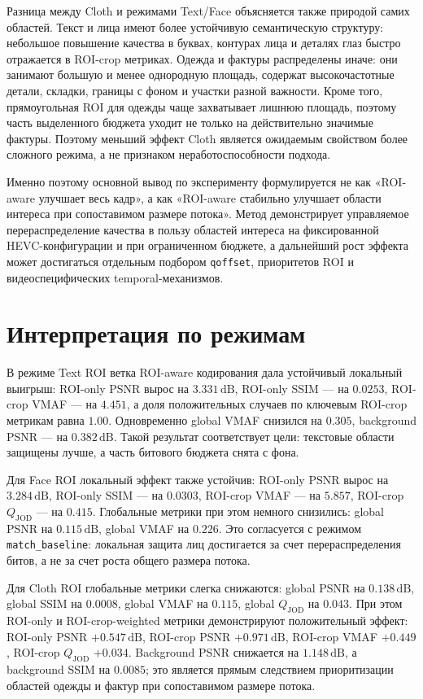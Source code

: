 \documentclass[12pt,a4paper,oneside,openany]{report}
\begin{document}
Разница между Cloth и режимами Text/Face объясняется также природой самих областей. Текст и лица
имеют более устойчивую семантическую структуру: небольшое повышение качества в буквах, контурах
лица и деталях глаз быстро отражается в ROI-crop метриках. Одежда и фактуры распределены иначе:
они занимают большую и менее однородную площадь, содержат высокочастотные детали, складки,
границы с фоном и участки разной важности. Кроме того, прямоугольная ROI для одежды чаще
захватывает лишнюю площадь, поэтому часть выделенного бюджета уходит не только на действительно
значимые фактуры. Поэтому меньший эффект Cloth является ожидаемым свойством более сложного
режима, а не признаком неработоспособности подхода.

Именно поэтому основной вывод по эксперименту формулируется не как «ROI-aware улучшает
весь кадр», а как «ROI-aware стабильно улучшает области интереса при сопоставимом размере
потока». Метод демонстрирует управляемое перераспределение качества в пользу областей интереса
на фиксированной HEVC-конфигурации и при ограниченном бюджете, а дальнейший рост эффекта может достигаться отдельным
подбором \texttt{qoffset}, приоритетов ROI и видеоспецифических temporal-механизмов.


\section{Интерпретация по режимам}

В режиме Text ROI ветка ROI-aware кодирования дала устойчивый локальный выигрыш: ROI-only PSNR вырос на
$3.331\,\mathrm{dB}$, ROI-only SSIM --- на $0.0253$, ROI-crop VMAF --- на $4.451$, а
доля положительных случаев по ключевым ROI-crop метрикам равна $1.00$. Одновременно global VMAF
снизился на $0.305$, background PSNR --- на $0.382\,\mathrm{dB}$. Такой результат соответствует
цели: текстовые области защищены лучше, а часть битового бюджета снята с фона.

Для Face ROI локальный эффект также устойчив: ROI-only PSNR вырос на $3.284\,\mathrm{dB}$,
ROI-only SSIM --- на $0.0303$, ROI-crop VMAF --- на $5.857$,
ROI-crop $Q_{\mathrm{JOD}}$ --- на $0.415$. Глобальные метрики при этом немного снизились:
global PSNR на $0.115\,\mathrm{dB}$, global VMAF на $0.226$. Это согласуется с режимом \texttt{match\_baseline}: локальная защита лиц достигается за счет перераспределения битов, а не за
счет роста общего размера потока.

Для Cloth ROI глобальные метрики слегка снижаются: global PSNR на $0.138\,\mathrm{dB}$,
global SSIM на $0.0008$, global VMAF на $0.115$, global $Q_{\mathrm{JOD}}$ на $0.043$. При этом
ROI-only и ROI-crop-weighted метрики демонстрируют положительный эффект: ROI-only PSNR
$+0.547\,\mathrm{dB}$, ROI-crop PSNR $+0.971\,\mathrm{dB}$, ROI-crop VMAF $+0.449$,
ROI-crop $Q_{\mathrm{JOD}}$ $+0.034$. Background PSNR снижается на $1.148\,\mathrm{dB}$, а
background SSIM на $0.0085$; это является прямым следствием приоритизации областей одежды и
фактур при сопоставимом размере потока.
\end{document}
